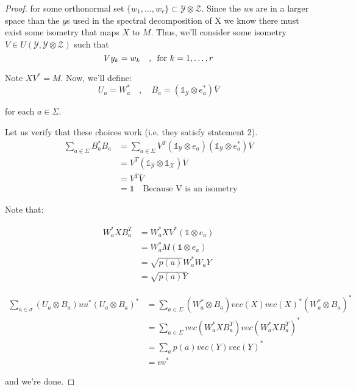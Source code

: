 \documentclass{article}
\begin{document}
\begin{proof}
for some orthonormal set $\{ w_1,\ldots,w_r\} \subset \mathcal{Y}\otimes
\mathcal{Z}$. Since the $w$s are in a larger space than the $y$s used in the
spectral decomposition of X we know there must exist some isometry that maps $X$
to $M$. Thus, we'll consider some isometry $V \in
U(\mathcal{Y},\mathcal{Y}\otimes \mathcal{Z})$ such that 
\[ 
    V y_k = w_k \quad, \enskip \text{for } k=1,\ldots,r 
\]

Note $ XV^* = M $. Now, we'll define:
\[ 
    U_a = W_a^* \quad,\quad B_a = \left( \mathds{1}_{\mathcal{Y}}\otimes e_a^*
    \right) \overline{V} 
\]

for each $a \in \Sigma$.

Let us verify that these choices work (i.e. they satisfy statement 2).
\begin{align*}
    \sum_{a\in\Sigma} B_a^* B_a &= \sum_{a\in\Sigma} V^T \left(
    \mathds{1}_{\mathcal{Y}} \otimes e_a \right) \left( \mathds{1}_{\mathcal{Y}}
\otimes e_a^*\right)\overline{V} \\
&= V^T \left( \mathds{1}_{\mathcal{Y}} \otimes   \mathds{1}_{\mathcal{X}}
\right) \overline{V} \\
&= V^T \overline{V} \\
&= \mathds{1} \quad \text{Because V is an isometry}
\end{align*}


Note that:

\begin{align*}
    W_a^* X B_a^T &= W_a^* XV^* \left( \mathds{1} \otimes e_a \right) \\
                  &= W_a^* M \left( \mathds{1}\otimes e_a \right)\\
                  &= \sqrt{p(a)} W_a^* W_a Y \\
                  &= \sqrt{p(a) Y}
\end{align*}

\begin{align*}
    \sum_{a \in \sigma} \left( U_a \otimes B_a \right) u u^* \left( U_a \otimes
    B_a\right)^* &= \sum_{a\in\Sigma} \left( W_a^* \otimes B_a \right) vec(X)
        vec(X)^* \left( W_a^* \otimes B_a \right)^* \\
        &= \sum_{a\in\Sigma} vec \left( W_a^* X B_a^T \right) vec(W_a^* X
        B_a^T)^* \\
        &= \sum_a p(a) vec(Y) vec(Y)^* \\
        &= vv^*
\end{align*}

and we're done.
\end{proof}
\end{document}
